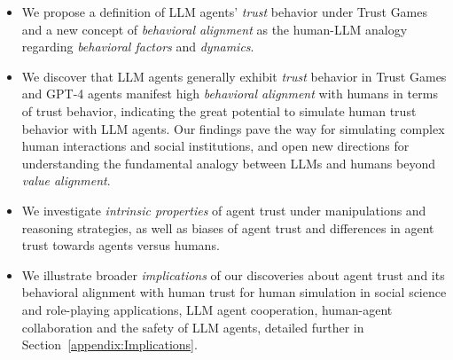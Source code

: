 \begin{itemize}[leftmargin=*]
   \vspace{-0.2cm}
    \item 
    We propose a definition of LLM agents' \textit{trust} behavior under Trust Games and a new concept of \textit{behavioral alignment} as the human-LLM analogy regarding \textit{behavioral factors} and \textit{dynamics}.
    \item 
    We discover that LLM agents generally exhibit \textit{trust} behavior in Trust Games and GPT-4 agents manifest high \textit{behavioral alignment} with humans in terms of trust behavior, indicating the great potential to simulate human trust behavior with LLM agents. 
    Our findings pave the way for simulating complex human interactions and social institutions, and open new directions for understanding the fundamental analogy between LLMs and humans beyond \textit{value alignment}.
    \item We investigate \textit{intrinsic properties} of agent trust under manipulations and reasoning strategies, as well as biases of agent trust and  differences in agent trust towards agents versus humans.
    \item We illustrate broader \textit{implications} of our discoveries about agent trust and its behavioral alignment with human trust for human simulation in social science and role-playing applications, LLM agent cooperation, human-agent collaboration and the safety of LLM agents, detailed further in Section~\ref{appendix:Implications}.
\end{itemize}

